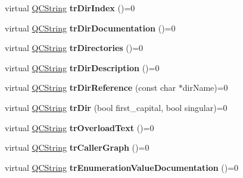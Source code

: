 \begin{DoxyCompactItemize}
\item 
\hypertarget{class_translator_aef21626d120305f405b0eb00c07cf09a}{virtual \hyperlink{class_q_c_string}{Q\-C\-String} {\bfseries tr\-Dir\-Index} ()=0}\label{class_translator_aef21626d120305f405b0eb00c07cf09a}

\item 
\hypertarget{class_translator_a06c5682aa4ddaaed33e88feebb669b90}{virtual \hyperlink{class_q_c_string}{Q\-C\-String} {\bfseries tr\-Dir\-Documentation} ()=0}\label{class_translator_a06c5682aa4ddaaed33e88feebb669b90}

\item 
\hypertarget{class_translator_a36531bc02d6bd58dd1ba589576f8c1a3}{virtual \hyperlink{class_q_c_string}{Q\-C\-String} {\bfseries tr\-Directories} ()=0}\label{class_translator_a36531bc02d6bd58dd1ba589576f8c1a3}

\item 
\hypertarget{class_translator_a957dd414e6b566a10138e1fb8909e421}{virtual \hyperlink{class_q_c_string}{Q\-C\-String} {\bfseries tr\-Dir\-Description} ()=0}\label{class_translator_a957dd414e6b566a10138e1fb8909e421}

\item 
\hypertarget{class_translator_a7f8bbda86aa6ec99ad86c849747e35f8}{virtual \hyperlink{class_q_c_string}{Q\-C\-String} {\bfseries tr\-Dir\-Reference} (const char $\ast$dir\-Name)=0}\label{class_translator_a7f8bbda86aa6ec99ad86c849747e35f8}

\item 
\hypertarget{class_translator_a23811f32a6bcf9d1bd1d16d27b212b93}{virtual \hyperlink{class_q_c_string}{Q\-C\-String} {\bfseries tr\-Dir} (bool first\-\_\-capital, bool singular)=0}\label{class_translator_a23811f32a6bcf9d1bd1d16d27b212b93}

\item 
\hypertarget{class_translator_ae2d04dc6a287015389c93173348f1083}{virtual \hyperlink{class_q_c_string}{Q\-C\-String} {\bfseries tr\-Overload\-Text} ()=0}\label{class_translator_ae2d04dc6a287015389c93173348f1083}

\item 
\hypertarget{class_translator_ac546bc09cd0175a996f7c947be2a8692}{virtual \hyperlink{class_q_c_string}{Q\-C\-String} {\bfseries tr\-Caller\-Graph} ()=0}\label{class_translator_ac546bc09cd0175a996f7c947be2a8692}

\item 
\hypertarget{class_translator_a6762f8e989e8fd4fce9f438efc3b36f0}{virtual \hyperlink{class_q_c_string}{Q\-C\-String} {\bfseries tr\-Enumeration\-Value\-Documentation} ()=0}\label{class_translator_a6762f8e989e8fd4fce9f438efc3b36f0}


\end{DoxyCompactItemize}
